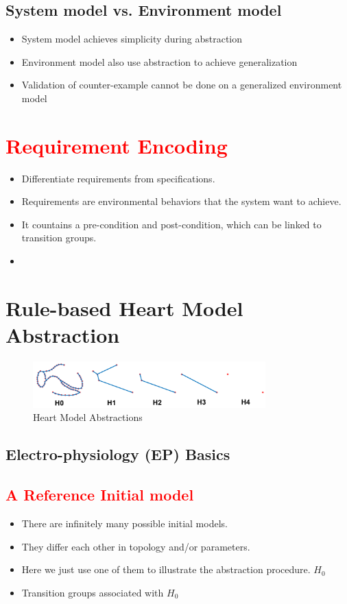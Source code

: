 \documentclass{llncs}
\begin{document}
\subsection{System model vs. Environment model}
\begin{itemize}
	\item System model achieves simplicity during abstraction
    \item Environment model also use abstraction to achieve generalization
    \item Validation of counter-example cannot be done on a generalized environment model
\end{itemize}

\section{\textcolor{red}{Requirement Encoding}}
\begin{itemize}
	\item Differentiate requirements from specifications.
    \item Requirements are environmental behaviors that the system want to achieve.
    \item It countains a pre-condition and post-condition, which can be linked to transition groups.
    \item 
\end{itemize}



\section{Rule-based Heart Model Abstraction}
\begin{figure}[!t]
		\centering
		\includegraphics[width=0.8\textwidth]{figs/HMs.png}
		\caption{\small Heart Model Abstractions}
		\label{fig:abs}
\end{figure}
\subsection{Electro-physiology (EP) Basics}
\subsection{\textcolor{red}{A Reference Initial model}}
\begin{itemize}
	\item There are infinitely many possible initial models.
    \item They differ each other in topology and/or parameters.
    \item Here we just use one of them to illustrate the abstraction procedure. $H_0$
    \item Transition groups associated with $H_0$
\end{itemize}
\end{document}
